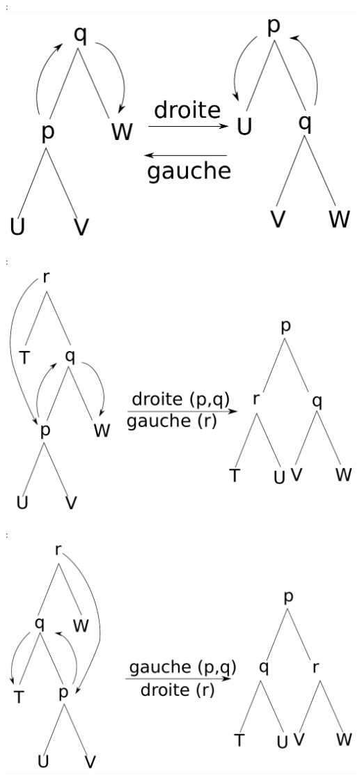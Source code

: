 \begin{center}

 :\\
\includegraphics[width=0.5\linewidth]{fig5_rotations_simples.pdf}\vskip 0.2cm

 :\\
\includegraphics[width=0.5\linewidth]{fig5_rotation_dg.pdf}\vskip 0.2cm

 :\\
\includegraphics[width=0.5\linewidth]{fig5_rotation_gd.pdf}\vskip 0.2cm

\end{center}
